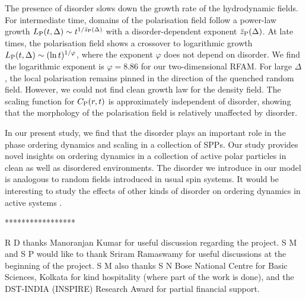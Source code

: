 \documentclass[pre,twocolumn,amssymb,showpacs,superscriptaddress,notitlepage]{revtex4-1}
\begin{document}
The presence of disorder slows down the growth rate of the hydrodynamic 
fields. 
For intermediate time, domains of the  polarisation field follow a power-law growth 
$L_{\rm  P}(t, \Delta) \sim t^{1/\bar{z}_{\rm  P}(\Delta)}$ 
with a disorder-dependent exponent $\bar{z}_{\rm  P}(\Delta)$. 
At late times, the  polarisation field shows a crossover to logarithmic growth  $L_{\rm  P}(t, \Delta) \sim (\ln t)^{1/\varphi}$, 
where the exponent  $\varphi$  does not depend on disorder. We find the logarithmic exponent 
 is $\varphi=8.86$ 
for our two-dimensional RFAM. For large $\Delta$, the local  polarisation remains pinned in the direction of the quenched random field.
However, we could not find clean growth law for the density field.
The scaling function for $C_{\rm  P}(r,t)$ is approximately independent of disorder, showing that the morphology of the 
 polarisation field is relatively unaffected by disorder.  

In our present study, we find that the disorder plays an important role in the  phase ordering dynamics and scaling in a collection of SPPs. Our study provides novel insights on ordering dynamics in a collection of active polar particles in clean as well as disordered environments.  The disorder we introduce in our model is analogous to random fields introduced in usual spin systems. It would be interesting to study the effects of other kinds of disorder on ordering dynamics in active systems \cite{shradha2014phil,sdeyprl2012,amb2014natcomm}.

\begin{center}
{*****************}
\end{center}

R D thanks Manoranjan Kumar for useful discussion regarding the project. S M and S P would like to thank Sriram Ramaswamy for useful discussions at the beginning of the project. S M also thanks S N Bose National Centre for Basic Sciences, Kolkata for kind hospitality (where part of the work is done), and the DST-INDIA (INSPIRE) Research Award for partial financial support. 
\end{document}
